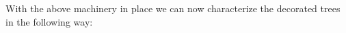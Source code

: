 \documentclass[a4paper, final]{amsart}
\theoremstyle{plain}
\newtheorem{cor}[thm]{Corollary}
\theoremstyle{definition}
\newcommand{\That}[1][T]{\widehat{#1}}
\DeclareMathOperator{\tildei}{\tilde{\textit{\i}}}
\DeclareMathOperator{\ocrp}{oCRP}
\newcommand\independent{\protect\mathpalette{\protect\independenT}{\perp}}
\def\independenT#1#2{\mathrel{\rlap{$#1#2$}\mkern2mu{#1#2}}}
\newcommand{\nin}{{n \in \mathbb{N}}}
\renewcommand{\P}{\mathrm{P}}
\newcommand{\N}{\mathbb{N}}
\DeclareMathOperator{\Unif}{Unif}
\begin{document}
%
%
%
%
%
With the above machinery in place we can now characterize the decorated trees in the following way:
%
\end{document}
